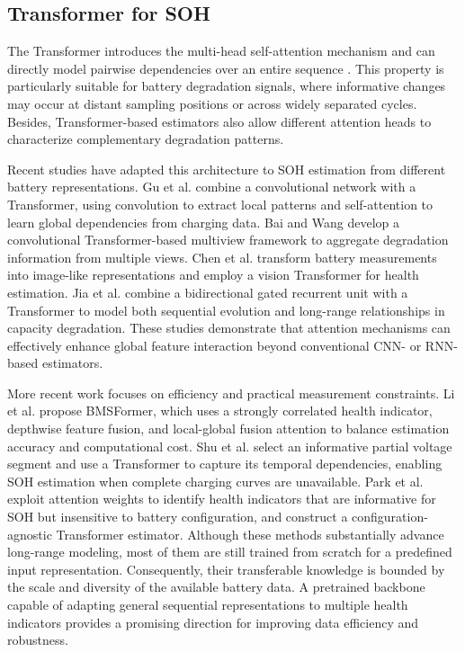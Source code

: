 \documentclass[preprint,12pt]{elsarticle}
\begin{document}
\subsection{Transformer for SOH}

The Transformer introduces the multi-head self-attention mechanism and can directly model pairwise dependencies over an entire sequence \cite{vaswani2017attention}. This property is particularly suitable for battery degradation signals, where informative changes may occur at distant sampling positions or across widely separated cycles. Besides, Transformer-based estimators also allow different attention heads to characterize complementary degradation patterns.

Recent studies have adapted this architecture to SOH estimation from different battery representations. Gu et al. \cite{gu2023novel} combine a convolutional network with a Transformer, using convolution to extract local patterns and self-attention to learn global dependencies from charging data. Bai and Wang \cite{bai2023convolutional} develop a convolutional Transformer-based multiview framework to aggregate degradation information from multiple views. Chen et al. \cite{chen2023vision} transform battery measurements into image-like representations and employ a vision Transformer for health estimation. Jia et al. \cite{jia2023state} combine a bidirectional gated recurrent unit with a Transformer to model both sequential evolution and long-range relationships in capacity degradation. These studies demonstrate that attention mechanisms can effectively enhance global feature interaction beyond conventional CNN- or RNN-based estimators.

More recent work focuses on efficiency and practical measurement constraints. Li et al. \cite{li2024bmsformer}propose BMSFormer, which uses a strongly correlated health indicator, depthwise feature fusion, and local-global fusion attention to balance estimation accuracy and computational cost. Shu et al. \cite{shu2025voltage} select an informative partial voltage segment and use a Transformer to capture its temporal dependencies, enabling SOH estimation when complete charging curves are unavailable. Park et al. \cite{park2026configuration} exploit attention weights to identify health indicators that are informative for SOH but insensitive to battery configuration, and construct a configuration-agnostic Transformer estimator. Although these methods substantially advance long-range modeling, most of them are still trained from scratch for a predefined input representation. Consequently, their transferable knowledge is bounded by the scale and diversity of the available battery data. A pretrained backbone capable of adapting general sequential representations to multiple health indicators provides a promising direction for improving data efficiency and robustness.
\end{document}
